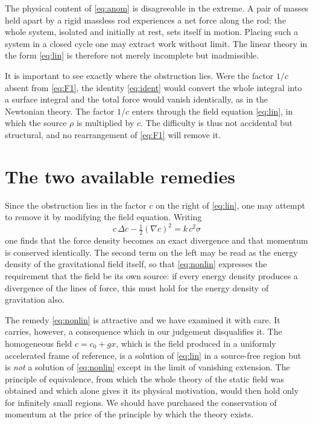 \documentclass[aps,prd,reprint,amsmath,amssymb,nofootinbib,longbibliography]{revtex4-2}
\begin{document}
The physical content of \eqref{eq:anom} is disagreeable in the extreme. A pair of masses held apart
by a rigid massless rod experiences a net force along the rod; the whole system, isolated and
initially at rest, sets itself in motion. Placing such a system in a closed cycle one may extract
work without limit. The linear theory in the form \eqref{eq:lin} is therefore not merely
incomplete but inadmissible.

It is important to see exactly where the obstruction lies. Were the factor $1/c$ absent from
\eqref{eq:F1}, the identity \eqref{eq:ident} would convert the whole integral into a surface
integral and the total force would vanish identically, as in the Newtonian theory. The factor $1/c$
enters through the field equation \eqref{eq:lin}, in which the source $\rho$ is multiplied by $c$.
The difficulty is thus not accidental but structural, and no rearrangement of \eqref{eq:F1} will
remove it.

\section{The two available remedies}

Since the obstruction lies in the factor $c$ on the right of \eqref{eq:lin}, one may attempt to
remove it by modifying the field equation. Writing
\begin{equation}
c\,\Delta c - \tfrac{1}{2} (\nabla c)^{2} = k\,c^{2}\sigma
\label{eq:nonlin}
\end{equation}
one finds that the force density becomes an exact divergence and that momentum is conserved
identically. The second term on the left may be read as the energy density of the gravitational
field itself, so that \eqref{eq:nonlin} expresses the requirement that the field be its own source:
if every energy density produces a divergence of the lines of force, this must hold for the energy
density of gravitation also.

The remedy \eqref{eq:nonlin} is attractive and we have examined it with care. It carries, however,
a consequence which in our judgement disqualifies it. The homogeneous field
$c = c_0 + g x$, which is the field produced in a uniformly accelerated frame of reference, is a
solution of \eqref{eq:lin} in a source-free region but is \emph{not} a solution of
\eqref{eq:nonlin} except in the limit of vanishing extension. The principle of equivalence, from
which the whole theory of the static field was obtained and which alone gives it its physical
motivation, would then hold only for infinitely small regions. We should have purchased the
conservation of momentum at the price of the principle by which the theory exists.
\end{document}
